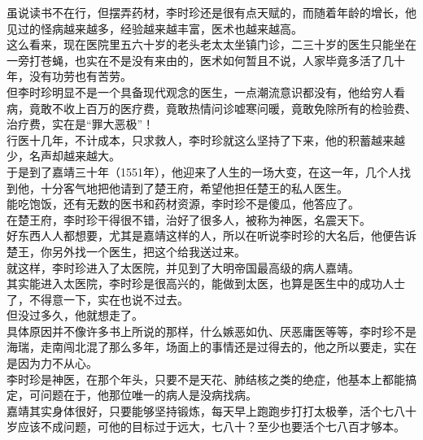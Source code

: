 \begin{multicols}{\theparacolNo}
虽说读书不在行，但摆弄药材，李时珍还是很有点天赋的，而随着年龄的增长，他见过的怪病越来越多，经验越来越丰富，医术也越来越高。\\

这么看来，现在医院里五六十岁的老头老太太坐镇门诊，二三十岁的医生只能坐在一旁打苍蝇，也实在不是没有来由的，医术如何暂且不说，人家毕竟多活了几十年，没有功劳也有苦劳。\\

但李时珍明显不是一个具备现代观念的医生，一点潮流意识都没有，他给穷人看病，竟敢不收上百万的医疗费，竟敢热情问诊嘘寒问暖，竟敢免除所有的检验费、治疗费，实在是“罪大恶极”！\\

行医十几年，不计成本，只求救人，李时珍就这么坚持了下来，他的积蓄越来越少，名声却越来越大。\\

于是到了嘉靖三十年（1551年），他迎来了人生的一场大变，在这一年，几个人找到他，十分客气地把他请到了楚王府，希望他担任楚王的私人医生。\\

能吃饱饭，还有无数的医书和药材资源，李时珍不是傻瓜，他答应了。\\

在楚王府，李时珍干得很不错，治好了很多人，被称为神医，名震天下。\\

好东西人人都想要，尤其是嘉靖这样的人，所以在听说李时珍的大名后，他便告诉楚王，你另外找一个医生，把这个给我送过来。\\

就这样，李时珍进入了太医院，并见到了大明帝国最高级的病人嘉靖。\\

其实能进入太医院，李时珍是很高兴的，能做到太医，也算是医生中的成功人士了，不得意一下，实在也说不过去。\\

但没过多久，他就想走了。\\

具体原因并不像许多书上所说的那样，什么嫉恶如仇、厌恶庸医等等，李时珍不是海瑞，走南闯北混了那么多年，场面上的事情还是过得去的，他之所以要走，实在是因为力不从心。\\

李时珍是神医，在那个年头，只要不是天花、肺结核之类的绝症，他基本上都能搞定，可问题在于，他那位唯一的病人是没病找病。\\

嘉靖其实身体很好，只要能够坚持锻炼，每天早上跑跑步打打太极拳，活个七八十岁应该不成问题，可他的目标过于远大，七八十？至少也要活个七八百才够本。\\


\end{multicols}
